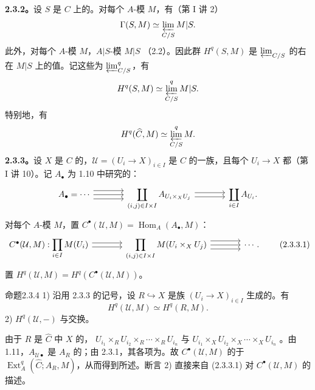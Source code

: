 \textbf{2.3.2。}设 $S$ 是 $C$ 上的。对每个 $A$-模 $M$，有（第 I 讲 2）
\[
 \Gamma(S,M)\simeq\varprojlim_{C/S}M|S.
\]
此外，对每个 $A$-模 $M$，$A|S$-模 $M|S$ （2.2）。因此群 $H^q(S,M)$ 是 $\varprojlim_{C/S}$ 的右在 $M|S$ 上的值。记这些为 $\varprojlim_{C/S}^{q}$，有
\[
 H^q(S,M)\simeq\varprojlim_{C/S}^{q}M|S.
\]
特别地，有
\[
 H^q(\widehat C,M)\simeq\varprojlim_{C/S}^{q}M.
\]
\textbf{2.3.3。}设 $X$ 是 $C$ 的，$\mathcal U=(U_i\to X)_{i\in I}$ 是 $C$ 的一族，且每个 $U_i\to X$ 都（第 I 讲 10）。记 $A_\bullet$ 为 1.10 中研究的：
\[
\begin{tikzcd}[column sep=large]
 A_\bullet=\cdots\arrow[r,shift left=2]\arrow[r]\arrow[r,shift right=2]&
 \displaystyle\coprod_{(i,j)\in I\times I}A_{U_i\times_XU_j}
 \arrow[r,shift left=1]\arrow[r,shift right=1]&\displaystyle\coprod_{i\in I}A_{U_i}.
\end{tikzcd}
\]
对每个 $A$-模 $M$，置 $C^\bullet(\mathcal U,M)=\operatorname{Hom}_A(A_\bullet,M)$：
\[
\begin{tikzcd}[column sep=large]
 C^\bullet(\mathcal U,M):\displaystyle\prod_{i\in I}M(U_i)
 \arrow[r,shift left=1]\arrow[r,shift right=1]&
 \displaystyle\prod_{(i,j)\in I\times I}M(U_i\times_XU_j)
 \arrow[r,shift left=2]\arrow[r]\arrow[r,shift right=2]&\cdots.
\end{tikzcd}\tag{2.3.3.1}
\]
置 $H^q(\mathcal U,M)=H^q(C^\bullet(\mathcal U,M))$。
\begin{SGAresult}{命题}{2.3.4}
1) 沿用 2.3.3 的记号，设 $R\hookrightarrow X$ 是族 $(U_i\to X)_{i\in I}$ 生成的。有
\[
 H^q(\mathcal U,M)\simeq H^q(R,M).
\]
2)  $H^q(\mathcal U,-)$ 与交换。
\end{SGAresult}
由于 $R$ 是 $\widehat C$ 中 $X$ 的，
$U_{i_1}\times_RU_{i_2}\times_R\cdots\times_RU_{i_n}$ 与
$U_{i_1}\times_XU_{i_2}\times_X\cdots\times_XU_{i_n}$ 。由 1.11，$A_{\mathcal U\bullet}$ 是 $A_R$ 的；由 2.3.1，其各项为。故 $C^\bullet(\mathcal U,M)$ 的于 $\operatorname{Ext}_A^q(\widehat C;A_R,M)$，从而得到所述。断言 2) 直接来自 (2.3.3.1) 对 $C^\bullet(\mathcal U,M)$ 的描述。
